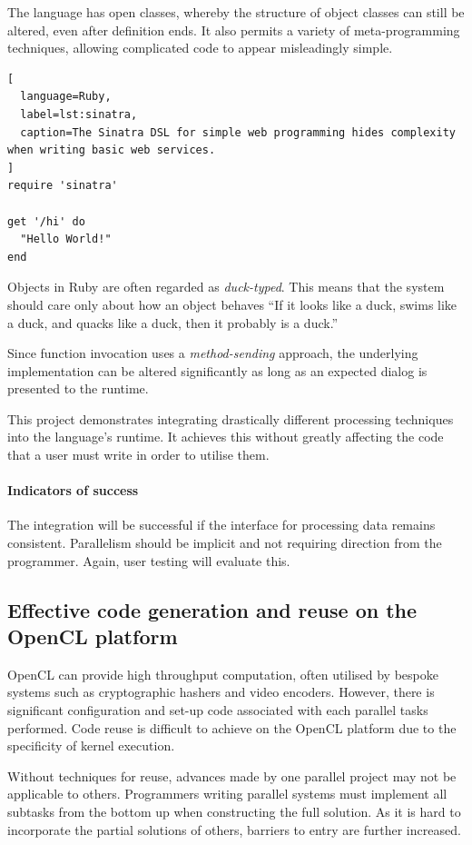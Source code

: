 The language has open classes, whereby the structure of object classes can still be altered, even after definition ends. It also permits a variety of meta-programming techniques, allowing complicated code to appear misleadingly simple.

\begin{lstlisting}[
  language=Ruby,
  label=lst:sinatra,
  caption=The Sinatra DSL for simple web programming hides complexity when writing basic web services.
]
require 'sinatra'

get '/hi' do
  "Hello World!"
end
\end{lstlisting}

Objects in Ruby are often regarded as \emph{duck-typed}. This means that the system should care only about how an object behaves \textemdash{} ``If it looks like a duck, swims like a duck, and quacks like a duck, then it probably is a duck.''\cite{ducktest}

Since function invocation uses a \emph{method-sending} approach, the underlying implementation can be altered significantly as long as an expected dialog is presented to the runtime.

This project demonstrates integrating drastically different processing techniques into the language's runtime. It achieves this without greatly affecting the code that a user must write in order to utilise them.

\paragraph*{Indicators of success}
The integration will be successful if the interface for processing data remains consistent. Parallelism should be implicit and not requiring direction from the programmer. Again, user testing will evaluate this.

\subsection{Effective code generation and reuse on the \ac{OpenCL} platform}
\ac{OpenCL} can provide high throughput computation, often utilised by bespoke systems such as cryptographic hashers and video encoders. However, there is significant configuration and set-up code associated with each parallel tasks performed. Code reuse is difficult to achieve on the \ac{OpenCL} platform due to the specificity of kernel execution.

Without techniques for reuse, advances made by one parallel project may not be applicable to others. Programmers writing parallel systems must implement all subtasks from the bottom up when constructing the full solution. As it is hard to incorporate the partial solutions of others, barriers to entry are further increased.

